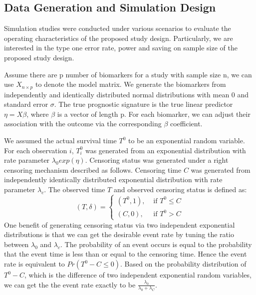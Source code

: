 \documentclass[11pt]{article}
\begin{document}
	\subsection{Data Generation and Simulation Design}
	
	\par Simulation studies were conducted under various scenarios to evaluate the operating characteristics of the proposed study design. Particularly, we are interested in the type one error rate, power and saving on sample size of the proposed study design.

	\par Assume there are p number of biomarkers for a study with sample size n, we can use $X_{n\times p}$ to denote the model matrix. We generate the biomarkers from independently and identically distributed normal distributions with mean 0 and standard error $\sigma$. The true prognostic signature is the true linear predictor $\eta = X\beta$, where $\beta$ is a vector of length p. For each biomarker, we can adjust their association with the outcome via the corresponding $\beta$ coefficient. 

	\par We assumed the actual survival time $T^0$ to be an exponential random variable. For each observation $i$, $T^{0}_{i}$ was generated from an exponential distribution with rate parameter $\lambda_{0}exp(\eta)$. Censoring status was generated under a right censoring mechanism described as follows. Censoring time $C$ was generated from independently identically distributed exponential distribution with rate parameter $\lambda_{c}$. The observed time $T$ and observed censoring status is defined as: 
	$$ (T,\delta)  = \begin{cases} 
					(T^{0}, 1), & \text{ if } T^{0} \leq C \\
					(C, 0), & \text{ if } T^{0} > C 
				   \end{cases} $$
One benefit of generating censoring status via two independent exponential distributions is that we can get the desirable event rate by tuning the ratio between $\lambda_{0}$ and $\lambda_{c}$. The probability of an event occurs is equal to the probability that the event time is less than or equal to the censoring time. Hence the event rate is equivalent to $Pr(T^0 - C \leq 0)$. Based on the probability distribution of $T^{0} - C$, which is the difference of two independent exponential random variables, we can get the the event rate exactly to be $\frac{\lambda_{0}}{\lambda_{0} + \lambda_{C}}$.
\end{document}
